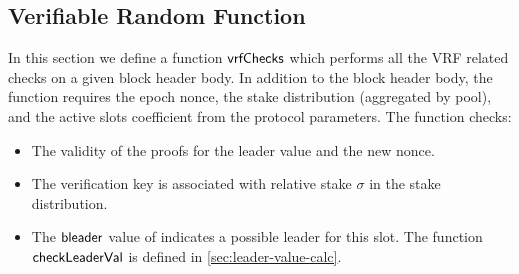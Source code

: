 \subsection{Verifiable Random Function}
\label{sec:verif-rand-funct}

In this section we define a function $\mathsf{vrfChecks}$ which performs all the VRF related checks
on a given block header body.
In addition to the block header body, the function requires the epoch nonce,
the stake distribution (aggregated by pool), and the active slots coefficient from the protocol
parameters. The function checks:

\begin{itemize}
\item The validity of the proofs for the leader value and the new nonce.
\item The verification key is associated with relative stake $\sigma$ in the stake distribution.
\item The $\mathsf{bleader}$ value of  indicates a possible leader for
  this slot. The function $\mathsf{checkLeaderVal}$ is defined in \ref{sec:leader-value-calc}.
\end{itemize}

